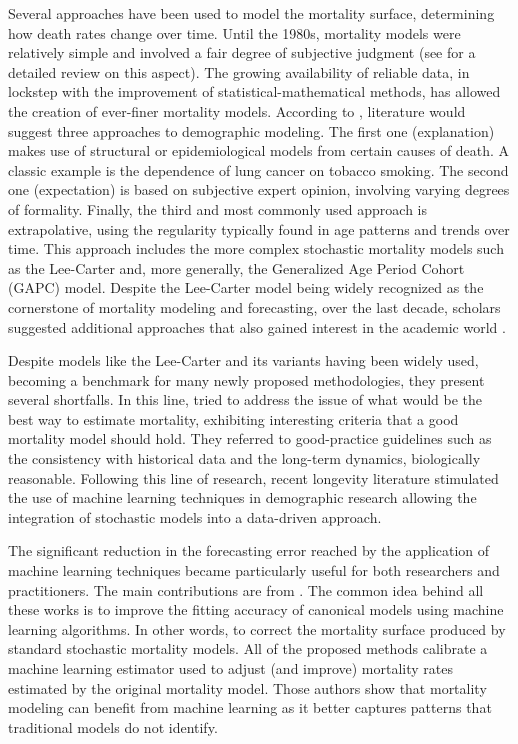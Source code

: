 \documentclass[fleqn,10pt]{wlscirep}
\begin{document}
Several approaches have been used to model the mortality surface, determining how death rates change over time. Until the 1980s, mortality models were relatively simple and involved a fair degree of subjective judgment (see \cite{Pollard} for a detailed review on this aspect). The growing availability of reliable data, in lockstep with the improvement of statistical-mathematical methods, has allowed the creation of ever-finer mortality models. According to \cite{Booth}, literature would suggest three approaches to demographic modeling. 
The first one (explanation) makes use of structural or epidemiological models from certain causes of death. A classic example is the dependence of lung cancer on tobacco smoking. The second one (expectation) is based on subjective expert opinion, involving varying degrees of formality. Finally, the third and most commonly used approach is extrapolative, using the regularity typically found in age patterns and trends over time.
This approach includes the more complex stochastic mortality models such as the Lee-Carter \cite{LC92} and, more generally, the Generalized Age Period Cohort (GAPC) model. Despite the Lee-Carter model being widely recognized as the cornerstone of mortality modeling and forecasting, over the last decade, scholars suggested additional approaches that also gained interest in the academic world \cite{BDV2002,RH,CBD06,CBD09}.

Despite models like the Lee-Carter and its variants having been widely used, becoming a benchmark for many newly proposed methodologies, they present several shortfalls. In this line, \cite{CBD08} tried to address the issue of what would be the best way to estimate mortality, exhibiting interesting criteria that a good mortality model should hold. They referred to good-practice guidelines such as the consistency with historical data and the long-term dynamics, biologically reasonable. Following this line of research, recent longevity literature stimulated the use of machine learning techniques in demographic research allowing the integration of stochastic models into a data-driven approach. 

The significant reduction in the forecasting error reached by the application of machine learning techniques became particularly useful for both researchers and practitioners. The main contributions are from \cite{Deprez,LevPiz,LevNi}. The common idea behind all these works is to improve the fitting accuracy of canonical models using machine learning algorithms. In other words, to correct the mortality surface produced by standard stochastic mortality models. All of the proposed methods calibrate a machine learning estimator used to adjust (and improve) mortality rates estimated by the original mortality model. Those authors show that mortality modeling can benefit from machine learning as it better captures patterns that traditional models do not identify. 
\end{document}
